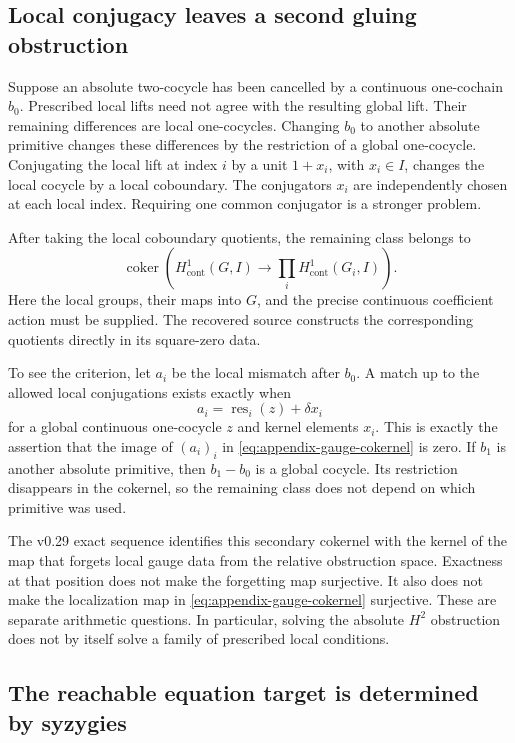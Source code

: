\subsection{Local conjugacy leaves a second gluing obstruction}

Suppose an absolute two-cocycle has been cancelled by a continuous
one-cochain $b_0$. Prescribed local lifts need not agree with the resulting
global lift. Their remaining differences are local one-cocycles. Changing
$b_0$ to another absolute primitive changes these differences by the
restriction of a global one-cocycle. Conjugating the local lift at index
$i$ by a unit $1+x_i$, with $x_i\in I$, changes the local cocycle by a
local coboundary. The conjugators $x_i$ are independently chosen at each
local index. Requiring one common conjugator is a stronger problem.

After taking the local coboundary quotients, the remaining class belongs to
\begin{equation}
 \operatorname{coker}\left(
 H^1_{\mathrm{cont}}(G,I)\longrightarrow
 \prod_i H^1_{\mathrm{cont}}(G_i,I)\right).
 \label{eq:appendix-gauge-cokernel}
\end{equation}
Here the local groups, their maps into $G$, and the precise continuous
coefficient action must be supplied. The recovered source constructs the
corresponding quotients directly in its square-zero data.

To see the criterion, let $a_i$ be the local mismatch after $b_0$. A match
up to the allowed local conjugations exists exactly when
\[
 a_i=\operatorname{res}_i(z)+\delta x_i
\]
for a global continuous one-cocycle $z$ and kernel elements $x_i$. This is
exactly the assertion that the image of $(a_i)_i$ in
\eqref{eq:appendix-gauge-cokernel} is zero. If $b_1$ is another absolute
primitive, then $b_1-b_0$ is a global cocycle. Its restriction disappears in
the cokernel, so the remaining class does not depend on which primitive
was used.

The v0.29 exact sequence identifies this secondary cokernel with the kernel
of the map that forgets local gauge data from the relative obstruction
space. Exactness at that position does not make the forgetting map
surjective. It also does not make the localization map in
\eqref{eq:appendix-gauge-cokernel} surjective. These are separate arithmetic
questions. In particular, solving the absolute $H^2$ obstruction does not
by itself solve a family of prescribed local conditions.

\subsection{The reachable equation target is determined by syzygies}

